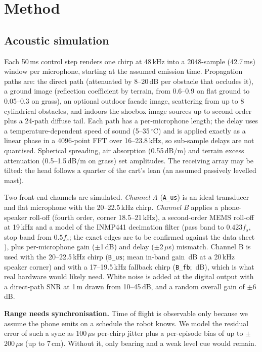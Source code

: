 \section{Method}

\subsection{Acoustic simulation}

Each 50\,ms control step renders one chirp at 48\,kHz into a 2048-sample (42.7\,ms) window per
microphone, starting at the assumed emission time. Propagation paths are: the direct path
(attenuated by 8--20\,dB per obstacle that occludes it), a ground image (reflection coefficient
by terrain, from 0.6--0.9 on flat ground to 0.05--0.3 on grass), an optional outdoor facade
image, scattering from up to 8 cylindrical obstacles, and indoors the shoebox image sources up
to second order \cite{allen1979image} plus a 24-path diffuse tail. Each path has a per-microphone
length; the delay uses a temperature-dependent speed of sound (5--35\,$^\circ$C) and is applied
exactly as a linear phase in a 4096-point FFT over 16--23.8\,kHz, so sub-sample delays are not
quantised. Spherical spreading, air absorption (0.55\,dB/m) and terrain excess attenuation
(0.5--1.5\,dB/m on grass) set amplitudes. The receiving array may be tilted: the head follows a
quarter of the cart's lean (an assumed passively levelled mast).

Two front-end channels are simulated. \emph{Channel A} (\texttt{A\_us}) is an ideal transducer
and flat microphone with the 20--22.5\,kHz chirp. \emph{Channel B} applies a phone-speaker
roll-off (fourth order, corner 18.5--21\,kHz), a second-order MEMS roll-off at 19\,kHz and a
model of the INMP441 decimation filter (pass band to $0.423f_s$, stop band from $0.5f_s$; the
exact edges are to be confirmed against the data sheet \cite{inmp441}), plus per-microphone gain
($\pm$1\,dB) and delay ($\pm$2\,$\mu$s) mismatch. Channel B is used with the 20--22.5\,kHz chirp
(\texttt{B\_us}; mean in-band gain \FeBus\,dB at a 20\,kHz speaker corner) and with a 17--19.5\,kHz fallback chirp
(\texttt{B\_fb}; \FeBfb\,dB), which is what real hardware would likely need. White noise is added at the
digital output with a direct-path SNR at 1\,m drawn from 10--45\,dB, and a random overall gain
of $\pm$6\,dB.

\textbf{Range needs synchronisation.} Time of flight is observable only because we assume the
phone emits on a schedule the robot knows. We model the residual error of such a sync as
100\,$\mu$s per-chirp jitter plus a per-episode bias of up to $\pm$200\,$\mu$s (up to 7\,cm).
Without it, only bearing and a weak level cue would remain.


